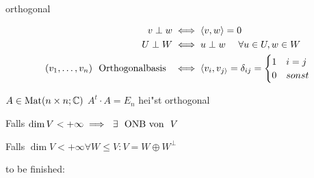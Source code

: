 \documentclass[class=article, crop=false]{standalone}
\begin{document}
\begin{zettel}{orthogonal}
\begin{flashcard}[]{}
	\begin{definition}
		\begin{align*}
			v \perp w                               & \iff  \langle v,w\rangle =0                                 \\
			U \perp W                               & \iff  u \perp w \quad \forall u \in  U, w \in  W            \\
			(v_1,\dots,v_n)  \tx{ Orthogonalbasis } & \iff  \langle v_i,v_{j\rangle}= \delta_{i j} = \begin{cases}
				                                                                                         1 & i=j   \\
				                                                                                         0 & sonst
			                                                                                         \end{cases}
		\end{align*}
	\end{definition}
\end{flashcard}

\begin{definition}
	$A \in  \operatorname{Mat}(n \times n; \mathbb{C} )$  $A^t \cdot  A = E_n$ hei"st orthogonal
\end{definition}

\begin{corollary}
	Falls $\dim V < + \infty \implies \exists \tx{ ONB von } V$
\end{corollary}

\begin{corollary}
	Falls $\dim V < + \infty \forall W \leq V : V = W \oplus W^{\perp}$
\end{corollary}


to be finished:

\end{zettel}
\end{document}
